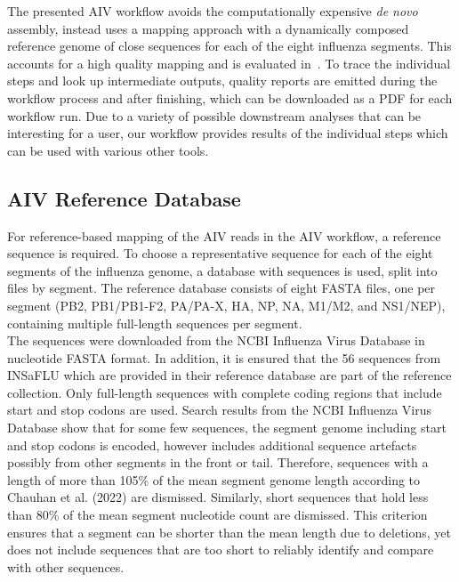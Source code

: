 The presented \ac{AIV} workflow avoids the computationally expensive \textit{de novo} assembly, instead uses a mapping approach with a dynamically composed reference genome of close sequences for each of the eight influenza segments. This accounts for a high quality mapping and is evaluated in~. To trace the individual steps and look up intermediate outputs, quality reports are emitted during the workflow process and after finishing, which can be downloaded as a PDF for each workflow run. Due to a variety of possible downstream analyses that can be interesting for a user, our workflow provides results of the individual steps which can be used with various other tools.

\subsection{AIV Reference Database}\label{sec:3-aiv-ref}
For reference-based mapping of the \ac{AIV} reads in the \ac{AIV} workflow, a reference sequence is required. To choose a representative sequence for each of the eight segments of the influenza genome, a database with sequences is used, split into files by segment. The reference database consists of eight FASTA files, one per segment (PB2, PB1/PB1-F2, PA/PA-X, HA, NP, NA, M1/M2, and NS1/NEP), containing multiple full-length sequences per segment.\\
The sequences were downloaded from the \ac{NCBI} Influenza Virus Database in nucleotide FASTA format. In addition, it is ensured that the 56 sequences from \ac{INSaFLU} which are provided in their reference database are part of the reference collection. Only full-length sequences with complete coding regions that include start and stop codons are used. Search results from the \ac{NCBI} Influenza Virus Database show that for some few sequences, the segment genome including start and stop codons is encoded, however includes additional sequence artefacts possibly from other segments in the front or tail. Therefore, sequences with a length of more than 105\% of the mean segment genome length according to Chauhan et al. (2022) are dismissed. Similarly, short sequences that hold less than 80\% of the mean segment nucleotide count are dismissed. This criterion ensures that a segment can be shorter than the mean length due to deletions, yet does not include sequences that are too short to reliably identify and compare with other sequences.\\
